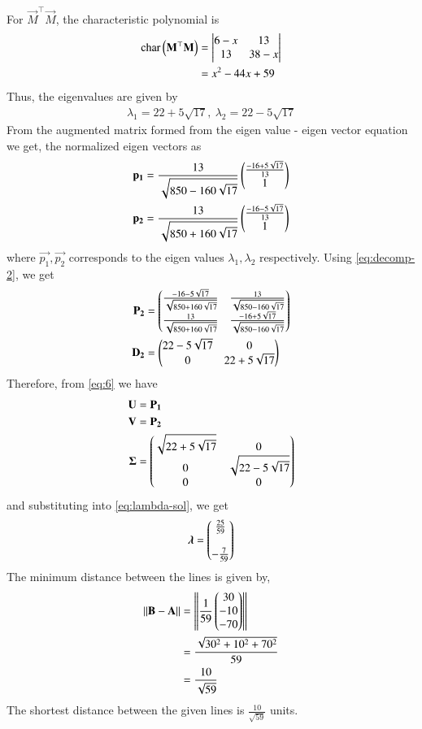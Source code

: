 \documentclass[journal,12pt,twocolumn]{IEEEtran}
\begin{document}
\begin{enumerate}
\begin{enumerate}
For $\vec{M}^\top\vec{M}$, the characteristic polynomial is
\begin{align}
    \text{char}\left(\mathbf{M}^\top\mathbf{M}\right) &= \begin{vmatrix}6-x&13\\13&38-x\end{vmatrix} \\&= x^2-44x+59
    \label{eq:char-1}
\end{align}
Thus, the eigenvalues are given by
\begin{align}
    \lambda_1 = 22+5\sqrt{17},\ \lambda_2 = 22-5\sqrt{17}
\end{align}
From the augmented matrix formed from the eigen value - eigen vector equation we get, the normalized eigen vectors as
\begin{align}
\mathbf{p_1} &= \frac{13}{\sqrt{850-160\sqrt{17}}}\begin{pmatrix}\frac{-16+5\sqrt{17}}{13}\\1\end{pmatrix}\\
\mathbf{p_2} &= \frac{13}{\sqrt{850+160\sqrt{17}}} \begin{pmatrix}\frac{-16-5\sqrt{17}}{13}\\1\end{pmatrix}
\end{align}
where $\vec{p_1},\vec{p_2}$ corresponds to the  eigen values $\lambda_1, \lambda_2$ respectively. Using \eqref{eq:decomp-2}, we get
\begin{align}
    \mathbf{P_2} &= \begin{pmatrix}\frac{-16-5\sqrt{17}}{\sqrt{850+160\sqrt{17}}}&\frac{13}{\sqrt{850-160\sqrt{17}}}\\\frac{13}{\sqrt{850+160\sqrt{17}}}&\frac{-16+5\sqrt{17}}{\sqrt{850-160\sqrt{17}}}\end{pmatrix}
     \label{eq:eig-params-2(a)}\\ 
    \mathbf{D_2} &= \begin{pmatrix}22-5\sqrt{17}&0\\0&22+5\sqrt{17}\end{pmatrix}
    \label{eq:eig-params-2(b)}
\end{align}
Therefore, from \eqref{eq:6} we have
\begin{align}
    \mathbf{U} &= \mathbf{P_1} \\ 
    \mathbf{V} &= \mathbf{P_2} \\
    \mathbf{\Sigma} &= \begin{pmatrix}\sqrt{22+5\sqrt{17}}&0\\0&\sqrt{22-5\sqrt{17}}\\0&0\end{pmatrix}
    \label{eq:svd-params}
\end{align}
and substituting into \eqref{eq:lambda-sol}, we get
\begin{align}
    \bm{\lambda} =  \begin{pmatrix}\frac{25}{59}\\\\-\frac{7}{59}\end{pmatrix}
\end{align}
The minimum distance between the lines is given by,
\begin{align}
\left\lVert\mathbf{B}-\mathbf{A}\right\rVert &= \left\lVert\frac{1}{59}\begin{pmatrix}30\\-10\\-70\end{pmatrix}\right\rVert\\
&= \frac{\sqrt{30^2+10^2+70^2}}{59}\\
&= \frac{10}{\sqrt{59}}
\end{align}
The shortest distance between the given lines is $\frac{10}{\sqrt{59}}$ units.


\end{enumerate}
\end{enumerate}
\end{document}
